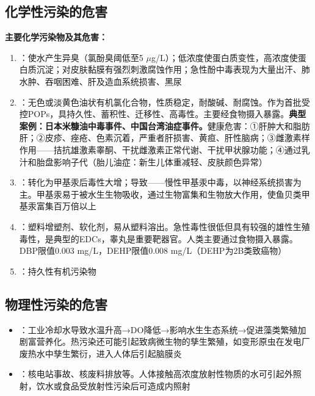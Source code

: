 \subsection{化学性污染的危害}

\begin{keybox}
\textbf{主要化学污染物及其危害：}

\begin{enumerate}[leftmargin=*]
    \item {}：使水产生异臭（氯酚臭阈低至5 $\mu$g/L）；低浓度使蛋白质变性，高浓度使蛋白质沉淀；对皮肤黏膜有强烈刺激腐蚀作用；急性酚中毒表现为大量出汗、肺水肿、吞咽困难、肝及造血系统损害、黑尿
    \item {}：无色或淡黄色油状有机氯化合物，性质稳定，耐酸碱、耐腐蚀。作为首批受控POPs，具持久性、蓄积性、迁移性、高毒性。主要经食物摄入暴露。\textbf{典型案例：日本米糠油中毒事件、中国台湾油症事件。}健康危害：①肝肿大和脂肪肝；②皮疹、痤疮、色素沉着，严重者肝损害、黄疸、肝性脑病；③雌激素样作用——拮抗雄激素睾酮、干扰雌激素正常代谢、干扰甲状腺功能；④通过乳汁和胎盘影响子代（胎儿油症：新生儿体重减轻、皮肤颜色异常）
    \item {}：转化为甲基汞后毒性大增；导致——慢性甲基汞中毒，以神经系统损害为主。甲基汞易于被水生生物吸收，通过生物富集和生物放大作用，使鱼贝类甲基汞富集百万倍以上
    \item {}：塑料增塑剂、软化剂，易从塑料溶出。急性毒性很低但具有较强的雄性生殖毒性，是典型的EDCs，睾丸是重要靶器官。人类主要通过食物摄入暴露。DBP限值0.003 mg/L，DEHP限值0.008 mg/L（DEHP为2B类致癌物）
    \item {}：持久性有机污染物
\end{enumerate}
\end{keybox}

\subsection{物理性污染的危害}

\begin{itemize}[leftmargin=*]
    \item {}：工业冷却水导致水温升高→DO降低→影响水生生态系统→促进藻类繁殖加剧富营养化。热污染还可能引起致病微生物的孳生繁殖，如变形原虫在发电厂废热水中孳生繁衍，进入人体后引起脑膜炎
    \item {}：核电站事故、核废料排放等。人体接触高浓度放射性物质的水可引起外照射，饮水或食品受放射性污染后可造成内照射
\end{itemize}

